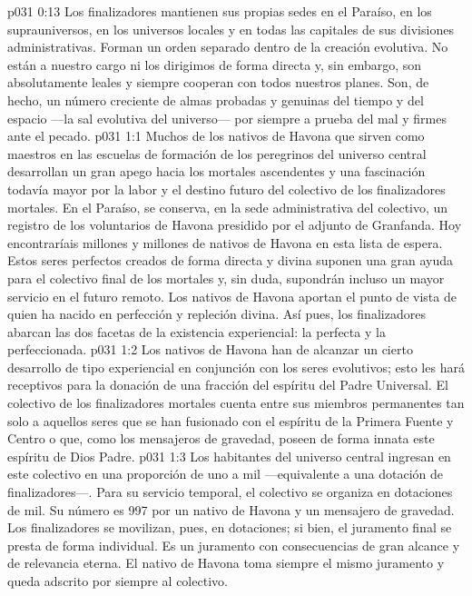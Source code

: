 \vs p031 0:13 Los finalizadores mantienen sus propias sedes en el Paraíso, en los suprauniversos, en los universos locales y en todas las capitales de sus divisiones administrativas. Forman un orden separado dentro de la creación evolutiva. No están a nuestro cargo ni los dirigimos de forma directa y, sin embargo, son absolutamente leales y siempre cooperan con todos nuestros planes. Son, de hecho, un número creciente de almas probadas y genuinas del tiempo y del espacio ---la sal evolutiva del universo--- por siempre a prueba del mal y firmes ante el pecado.
\vs p031 1:1 Muchos de los nativos de Havona que sirven como maestros en las escuelas de formación de los peregrinos del universo central desarrollan un gran apego hacia los mortales ascendentes y una fascinación todavía mayor por la labor y el destino futuro del colectivo de los finalizadores mortales. En el Paraíso, se conserva, en la sede administrativa del colectivo, un registro de los voluntarios de Havona presidido por el adjunto de Granfanda. Hoy encontraríais millones y millones de nativos de Havona en esta lista de espera. Estos seres perfectos creados de forma directa y divina suponen una gran ayuda para el colectivo final de los mortales y, sin duda, supondrán incluso un mayor servicio en el futuro remoto. Los nativos de Havona aportan el punto de vista de quien ha nacido en perfección y repleción divina. Así pues, los finalizadores abarcan las dos facetas de la existencia experiencial: la perfecta y la perfeccionada.
\vs p031 1:2 Los nativos de Havona han de alcanzar un cierto desarrollo de tipo experiencial en conjunción con los seres evolutivos; esto les hará receptivos para la donación de una fracción del espíritu del Padre Universal. El colectivo de los finalizadores mortales cuenta entre sus miembros permanentes tan solo a aquellos seres que se han fusionado con el espíritu de la Primera Fuente y Centro o que, como los mensajeros de gravedad, poseen de forma innata este espíritu de Dios Padre.
\vs p031 1:3 Los habitantes del universo central ingresan en este colectivo en una proporción de uno a mil ---equivalente a una dotación de finalizadores---. Para su servicio temporal, el colectivo se organiza en dotaciones de mil. Su número es 997 por un nativo de Havona y un mensajero de gravedad. Los finalizadores se movilizan, pues, en dotaciones; si bien, el juramento final se presta de forma individual. Es un juramento con consecuencias de gran alcance y de relevancia eterna. El nativo de Havona toma siempre el mismo juramento y queda adscrito por siempre al colectivo.
